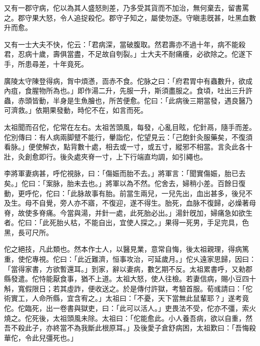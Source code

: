 \begin{pinyinscope}
又有一郡守病，佗以為其人盛怒則差，乃多受其貨而不加治，無何棄去，留書罵之。郡守果大怒，令人追捉殺佗。郡守子知之，屬使勿逐。守瞋恚旣甚，吐黑血數升而愈。

又有一士大夫不快，佗云：「君病深，當破腹取。然君壽亦不過十年，病不能殺君，忍病十歲，壽俱當盡，不足故自刳裂。」士大夫不耐痛癢，必欲除之。佗遂下手，所患尋差，十年竟死。

廣陵太守陳登得病，胷中煩懣，靣赤不食。佗脉之曰：「府君胃中有蟲數升，欲成內疽，食腥物所為也。」即作湯二升，先服一升，斯須盡服之。食頃，吐出三升許蟲，赤頭皆動，半身是生魚膾也，所苦便愈。佗曰：「此病後三期當發，遇良醫乃可濟救。」依期果發動，時佗不在，如言而死。

太祖聞而召佗，佗常在左右。太祖苦頭風，每發，心亂目眩，佗針鬲，隨手而差。佗別傳曰：有人病兩脚躄不能行，轝詣佗，佗望見云：「己飽針灸服藥矣，不復須看脉。」便使解衣，點背數十處，相去或一寸，或五寸，縱邪不相當。言灸此各十壯，灸創愈即行。後灸處夾脊一寸，上下行端直均調，如引繩也。

李將軍妻病甚，呼佗視脉，曰：「傷娠而胎不去。」將軍言：「聞實傷娠，胎已去矣。」佗曰：「案脉，胎未去也。」將軍以為不然。佗舍去，婦稍小差。百餘日復動，更呼佗，佗曰：「此脉故事有胎。前當生兩兒，一兒先出，血出甚多，後兒不及生。母不自覺，旁人亦不寤，不復迎，遂不得生。胎死，血脉不復歸，必燥著母脊，故使多脊痛。今當與湯，并針一處，此死胎必出。」湯針旣加，婦痛急如欲生者。佗曰：「此死胎乆枯，不能自出，宜使人探之。」果得一死男，手足完具，色黑，長可尺所。

佗之絕技，凡此類也。然本作士人，以醫見業，意常自悔，後太祖親理，得病篤重，使佗專視。佗曰：「此近難濟，恒事攻治，可延歲月。」佗乆遠家思歸，因曰：「當得家書，方欲暫還耳。」到家，辭以妻病，數乞期不反。太祖累書呼，又勑郡縣發遣。佗恃能厭食事，猶不上道。太祖大怒，使人往檢。若妻信病，賜小豆四十斛，寬假限日；若其虛詐，便收送之。於是傳付許獄，考驗首服。荀彧請曰：「佗術實工，人命所縣，宜含宥之。」太祖曰：「不憂，天下當無此鼠輩耶？」遂考竟佗。佗臨死，出一卷書與獄吏，曰：「此可以活人。」吏畏法不受，佗亦不彊，索火燒之。佗死後，太祖頭風未除。太祖曰：「佗能愈此。小人養吾病，欲以自重，然吾不殺此子，亦終當不為我斷此根原耳。」及後愛子倉舒病困，太祖歎曰：「吾悔殺華佗，令此兒彊死也。」


\end{pinyinscope}
